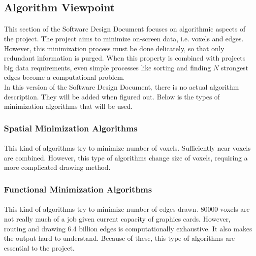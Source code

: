 
\subsection{Algorithm Viewpoint}
\paragraph{}
\normalsize
This section of the Software Design Document focuses on algorithmic aspects of the project. The project aims to minimize on-screen data, i.e. voxels and edges. However, this minimization process must be done delicately, so that only redundant information is purged. When this property is combined with projects big data requirements, even simple processes like sorting and finding $N$ strongest edges become a computational problem.\\

In this version of the Software Design Document, there is no actual algorithm description. They will be added when figured out. Below is the types of minimization algorithms that will be used.\\

\subsubsection{Spatial Minimization Algorithms}
\paragraph{}
This kind of algorithms try to minimize number of voxels. Sufficiently near voxels are combined. However, this type of algorithms change size of voxels, requiring a more complicated drawing method.\\

\subsubsection{Functional Minimization Algorithms}
\paragraph{}
This kind of algorithms try to minimize number of edges drawn. 80000 voxels are not really much of a job given current capacity of graphics cards. However, routing and drawing 6.4 billion edges is computationally exhaustive. It also makes the output hard to understand. Because of these, this type of algorithms are essential to the project.
    
\skipsubsection
